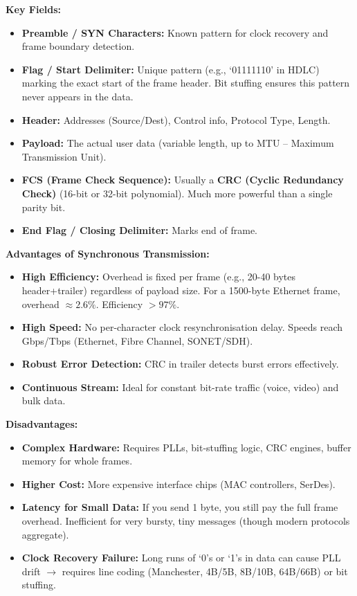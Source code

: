 \documentclass[11pt]{article}
\begin{document}
\textbf{Key Fields:}
\begin{itemize}
    \item \textbf{Preamble / SYN Characters:} Known pattern for clock recovery and frame boundary detection.
    \item \textbf{Flag / Start Delimiter:} Unique pattern (e.g., `01111110' in HDLC) marking the exact start of the frame header. Bit stuffing ensures this pattern never appears in the data.
    \item \textbf{Header:} Addresses (Source/Dest), Control info, Protocol Type, Length.
    \item \textbf{Payload:} The actual user data (variable length, up to MTU -- Maximum Transmission Unit).
    \item \textbf{FCS (Frame Check Sequence):} Usually a \textbf{CRC (Cyclic Redundancy Check)} (16-bit or 32-bit polynomial). Much more powerful than a single parity bit.
    \item \textbf{End Flag / Closing Delimiter:} Marks end of frame.
\end{itemize}

\textbf{Advantages of Synchronous Transmission:}
\begin{itemize}
    \item \textbf{High Efficiency:} Overhead is fixed per frame (e.g., 20-40 bytes header+trailer) regardless of payload size. For a 1500-byte Ethernet frame, overhead $\approx 2.6\%$. Efficiency $> 97\%$.
    \item \textbf{High Speed:} No per-character clock resynchronisation delay. Speeds reach Gbps/Tbps (Ethernet, Fibre Channel, SONET/SDH).
    \item \textbf{Robust Error Detection:} CRC in trailer detects burst errors effectively.
    \item \textbf{Continuous Stream:} Ideal for constant bit-rate traffic (voice, video) and bulk data.
\end{itemize}

\textbf{Disadvantages:}
\begin{itemize}
    \item \textbf{Complex Hardware:} Requires PLLs, bit-stuffing logic, CRC engines, buffer memory for whole frames.
    \item \textbf{Higher Cost:} More expensive interface chips (MAC controllers, SerDes).
    \item \textbf{Latency for Small Data:} If you send 1 byte, you still pay the full frame overhead. Inefficient for very bursty, tiny messages (though modern protocols aggregate).
    \item \textbf{Clock Recovery Failure:} Long runs of `0's or `1's in data can cause PLL drift $\rightarrow$ requires line coding (Manchester, 4B/5B, 8B/10B, 64B/66B) or bit stuffing.
\end{itemize}
\end{document}
